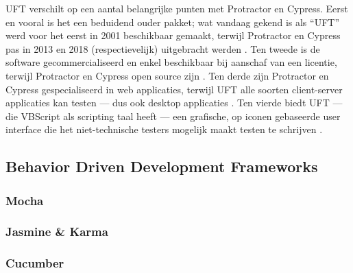 UFT verschilt op een aantal belangrijke punten met Protractor en Cypress. Eerst en vooral is het een beduidend ouder pakket; wat vandaag gekend is als ``UFT'' werd voor het eerst in 2001 beschikbaar gemaakt, terwijl Protractor en Cypress pas in 2013 en 2018 (respectievelijk) uitgebracht werden \autocite{Swati2020,Mann2018,Amorim2014}. Ten tweede is de software gecommercialiseerd en enkel beschikbaar bij aanschaf van een licentie, terwijl Protractor en Cypress open source zijn \autocite{Guru99SeleniumUFTDifference,VSoftUFTvsSelenium,Mann2017,Kumar}. Ten derde zijn Protractor en Cypress gespecialiseerd in web applicaties, terwijl UFT alle soorten client-server applicaties kan testen — dus ook desktop applicaties \autocite{Tribbiani2017,Cypress1,Amorim2014}. Ten vierde biedt UFT — die VBScript als scripting taal heeft \autocite{Rajkumar2017} — een grafische, op iconen gebaseerde user interface die het niet-technische testers mogelijk maakt testen te schrijven \autocite{Guru99WhatIsQTPUFT}.





%


\subsection{Behavior Driven Development Frameworks}

\lipsum[9]

\subsubsection{Mocha}

\lipsum[8-9]

\subsubsection{Jasmine \& Karma}

\lipsum[8-9]

\subsubsection{Cucumber}

\lipsum[8-9]